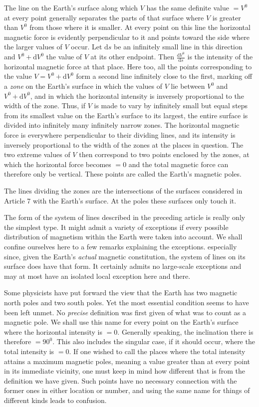 The line on the Earth's surface along which $V$ has the same definite value $=V^0$ at every point generally separates the parts of that surface where $V$ is greater than $V^0$ from those where it is smaller. At every point on this line the horizontal magnetic force is evidently perpendicular to it and points toward the side where the larger values of $V$ occur. Let $\mathrm{d}s$ be an infinitely small line in this direction and $V^0+\mathrm{d}V^0$ the value of $V$ at its other endpoint. Then $\frac{\mathrm{d}V^0}{\mathrm{d}s}$ is the intensity of the horizontal magnetic force at that place. Here too, all the points corresponding to the value $V=V^0+\mathrm{d}V^0$ form a second line infinitely close to the first, marking off a \textit{zone} on the Earth's surface in which the values of $V$ lie between $V^0$ and $V^0+\mathrm{d}V^0$, and in which the horizontal intensity is inversely proportional to the width of the zone. Thus, if $V$ is made to vary by infinitely small but equal steps from its smallest value on the Earth's surface to its largest, the entire surface is divided into infinitely many infinitely narrow zones. The horizontal magnetic force is everywhere perpendicular to their dividing lines, and its intensity is inversely proportional to the width of the zones at the places in question. The two extreme values of $V$ then correspond to two points enclosed by the zones, at which the horizontal force becomes $=0$ and the total magnetic force can therefore only be vertical. These points are called the Earth's magnetic poles.

The lines dividing the zones are the intersections of the surfaces considered in Article 7 with the Earth's surface. At the poles these surfaces only touch it.

The form of the system of lines described in the preceding article is really only the simplest type. It might admit a variety of exceptions if every possible distribution of magnetism within the Earth were taken into account. We shall confine ourselves here to a few remarks explaining the exceptions. especially since, given the Earth's \textit{actual} magnetic constitution, the system of lines on its surface does have that form. It certainly admits no large-scale exceptions and may at most have an isolated local exception here and there.

Some physicists have put forward the view that the Earth has two magnetic north poles and two south poles. Yet the most essential condition seems to have been left unmet. No \textit{precise} definition was first given of what was to count as a magnetic pole. We shall use this name for every point on the Earth's surface where the horizontal intensity is $=0$. Generally speaking, the inclination there is therefore $=90^0$. This also includes the singular case, if it should occur, where the total intensity is $=0$. If one wished to call the places where the total intensity attains a maximum magnetic poles, meaning a value greater than at every point in its immediate vicinity, one must keep in mind how different that is from the definition we have given. Such points have no necessary connection with the former ones in either location or number, and using the same name for things of different kinds leads to confusion.

